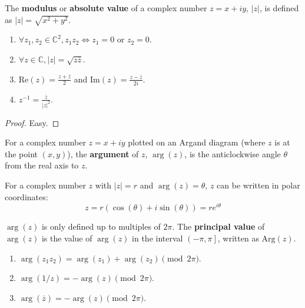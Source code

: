 \begin{definition}
	The \textbf{modulus} or \textbf{absolute value} of a complex number $z = x + iy$, $|z|$, is defined as $|z| = \sqrt{x^2 + y^2}$.
\end{definition}

\begin{lemma}
	\hfill
	\begin{enumerate}
		\item $\forall z_1, z_2 \in \mathbb{C}^2, z_1 z_2 \Longleftrightarrow z_1 = 0 \text{ or } z_2 = 0$.
		\item $\forall z \in \mathbb{C}, |z| = \sqrt{z \overline{z}}$.
		\item $\text{Re}(z) = \frac{z + \overline{z}}{2}$ and $\text{Im}(z) = \frac{z - \overline{z}}{2i}$.
		\item $z^{-1} = \frac{\overline{z}}{|z|^2}$.
	\end{enumerate}
\end{lemma}

\begin{proof}
	Easy.
\end{proof}

\begin{definition}
	For a complex number $z = x + iy$ plotted on an Argand diagram (where $z$ is at the point $(x, y)$), the \textbf{argument} of $z$, $\arg(z)$, is the anticlockwise angle $\theta$ from the real axis to $z$.
\end{definition}

\begin{definition}
	For a complex number $z$ with $|z| = r$ and $\arg(z) = \theta$, $z$ can be written in polar coordinates:
	\[
		z = r(\cos(\theta) + i \sin(\theta)) = r e^{i \theta}
	\]
\end{definition}

\begin{definition}
	$\arg(z)$ is only defined up to multiples of $2 \pi$. The \textbf{principal value} of $\arg(z)$ is the value of $\arg(z)$ in the interval $\left(-\pi, \pi \right]$, written as $\text{Arg}(z)$.
\end{definition}

\begin{lemma}
	\hfill
	\begin{enumerate}
		\item $\arg(z_1 z_2) = \arg(z_1) + \arg(z_2) \pmod{2 \pi}$.
		\item $\arg(1 / z) = -\arg(z) \pmod{2 \pi}$.
		\item $\arg(\overline{z}) = -\arg(z) \pmod{2 \pi}$.
	\end{enumerate}
\end{lemma}

